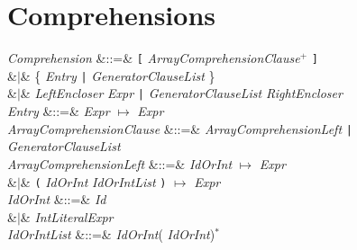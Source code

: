 %
%
%
%

\section{Comprehensions}


\begin{Grammar}
\emph{Comprehension}
&::=&
 \texttt{[} 
\emph{ArrayComprehensionClause}$^+$ \texttt{]}\\
&$|$&
 \{ 
\emph{Entry} \texttt{|} \emph{GeneratorClauseList} \} \\
&$|$&  \emph{LeftEncloser} 
\emph{Expr} \texttt{|} \emph{GeneratorClauseList} \emph{RightEncloser} \\

\emph{Entry} &::=& \emph{Expr} \ensuremath{\mapsto} \emph{Expr} \\

\emph{ArrayComprehensionClause} &::=&
\emph{ArrayComprehensionLeft} \texttt{|} \emph{GeneratorClauseList}\\

\emph{ArrayComprehensionLeft} &::=&
\emph{IdOrInt} \ensuremath{\mapsto} \emph{Expr}\\
&$|$& \texttt( \emph{IdOrInt}\EXP{,} \emph{IdOrIntList} \texttt) \ensuremath{\mapsto} \emph{Expr}\\

\emph{IdOrInt} &::=& \emph{Id}\\
&$|$& \emph{IntLiteralExpr}\\

\emph{IdOrIntList} &::=& \emph{IdOrInt}(\EXP{,} \emph{IdOrInt})$^*$ \\
\end{Grammar}

